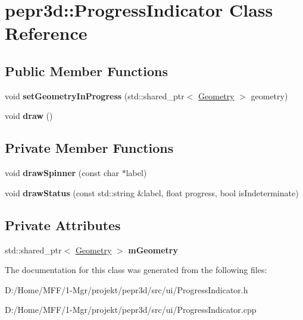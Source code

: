 \hypertarget{classpepr3d_1_1_progress_indicator}{}\section{pepr3d\+::Progress\+Indicator Class Reference}
\label{classpepr3d_1_1_progress_indicator}
\subsection*{Public Member Functions}
\begin{DoxyCompactItemize}
\item 
\mbox{\label{classpepr3d_1_1_progress_indicator_ac0931998aeb37b012ca79b418896044b}} 
void {\bfseries set\+Geometry\+In\+Progress} (std\+::shared\+\_\+ptr$<$ \mbox{\hyperlink{classpepr3d_1_1_geometry}{Geometry}} $>$ geometry)
\item 
\mbox{\label{classpepr3d_1_1_progress_indicator_a6b9af9848a2fb8bf39e38b9c9b8fc001}} 
void {\bfseries draw} ()
\end{DoxyCompactItemize}
\subsection*{Private Member Functions}
\begin{DoxyCompactItemize}
\item 
\mbox{\label{classpepr3d_1_1_progress_indicator_a8f0893bc73387592c4013831417f1824}} 
void {\bfseries draw\+Spinner} (const char $\ast$label)
\item 
\mbox{\label{classpepr3d_1_1_progress_indicator_aa4ecbee160baa9e56864d382b737c6dd}} 
void {\bfseries draw\+Status} (const std\+::string \&label, float progress, bool is\+Indeterminate)
\end{DoxyCompactItemize}
\subsection*{Private Attributes}
\begin{DoxyCompactItemize}
\item 
\mbox{\label{classpepr3d_1_1_progress_indicator_a7f971e9165e17d75ea27dbcbc402991d}} 
std\+::shared\+\_\+ptr$<$ \mbox{\hyperlink{classpepr3d_1_1_geometry}{Geometry}} $>$ {\bfseries m\+Geometry}
\end{DoxyCompactItemize}


The documentation for this class was generated from the following files\+:\begin{DoxyCompactItemize}
\item 
D\+:/\+Home/\+M\+F\+F/1-\/\+Mgr/projekt/pepr3d/src/ui/Progress\+Indicator.\+h\item 
D\+:/\+Home/\+M\+F\+F/1-\/\+Mgr/projekt/pepr3d/src/ui/Progress\+Indicator.\+cpp\end{DoxyCompactItemize}
